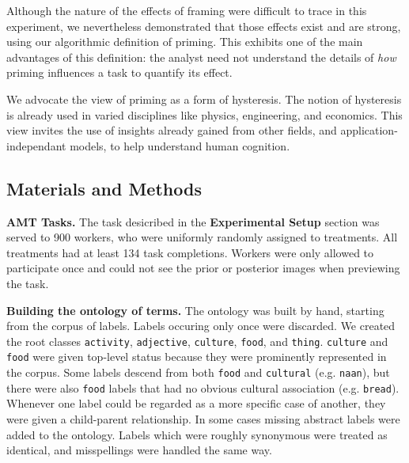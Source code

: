 \documentclass[a4paper]{report}
\begin{document}
Although the nature of the effects of framing were difficult to trace
in this experiment, we nevertheless demonstrated that those effects exist
and are strong, using our algorithmic definition of priming.  This exhibits
one of the main advantages of this definition: the analyst need 
not understand the details of \textit{how} priming influences a task to 
quantify its effect.

We advocate the view of priming as a form of hysteresis.  The notion of 
hysteresis is already used in varied disciplines like physics, engineering,
and economics.  This view invites the use of insights already gained from 
other fields, and application-independant models, to help understand human 
cognition.

\subsection*{Materials and Methods}

\textbf{AMT Tasks.} The task desicribed in the \textbf{Experimental Setup}
section was served to 900 workers, who were uniformly randomly assigned to
treatments.  All treatments had at least 134 task completions.  Workers were
only allowed to participate once and could not see the prior or posterior 
images when previewing the task.

\textbf{Building the ontology of terms.}  The ontology was built by hand, 
starting from the corpus of labels. Labels occuring only once were discarded.  
We created the 
root classes \texttt{activity}, \texttt{adjective}, \texttt{culture}, 
\texttt{food}, and \texttt{thing}. \texttt{culture} and \texttt{food} were 
given top-level status because they were prominently represented in the corpus.
Some labels descend from both \texttt{food} and \texttt{cultural}  
(e.g. \texttt{naan}), but there were also \texttt{food} labels that had no
obvious cultural association (e.g. \texttt{bread}). Whenever one label 
could be regarded as a more specific case of another, they were given a 
child-parent relationship. In some cases missing abstract labels were added to 
the ontology.  Labels which were roughly synonymous were treated as identical,
and misspellings were handled the same way.
\end{document}
